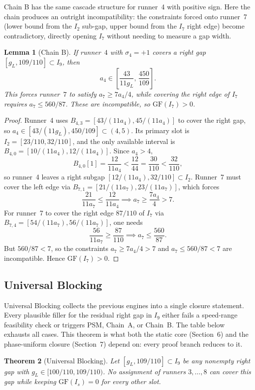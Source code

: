 \documentclass[12pt,a4paper]{amsart}
\newtheorem{theorem}{Theorem}[section]
\newtheorem{lemma}[theorem]{Lemma}
\theoremstyle{definition}
\theoremstyle{remark}
\newcommand{\GF}{\mathrm{GF}}
\begin{document}
Chain B has the same cascade structure for runner~4 with positive sign. Here the chain
produces an outright incompatibility: the constraints forced onto runner~7 (lower bound
from the $I_2$ sub-gap, upper bound from the $I_7$ right edge) become contradictory,
directly opening $I_7$ without needing to measure a gap width.

\begin{lemma}[Chain B]\label{lem:chainB}
If runner~$4$ with $\sigma_4=+1$ covers a right gap $[g_L,109/110]\subset I_9$, then
\[
  a_4 \in \left[\frac{43}{11g_L},\,\frac{450}{109}\right].
\]
This forces runner~$7$ to satisfy $a_7\ge 7a_4/4$, while covering the right edge of $I_7$
requires $a_7\le 560/87$. These are incompatible, so $\GF(I_7)>0$.
\end{lemma}

\begin{proof}
Runner~4 uses $B_{4,3}=[43/(11a_4),45/(11a_4)]$ to cover the right gap, so
$a_4\in[43/(11g_L),450/109]\subset(4,5)$. Its primary slot is $I_2=[23/110,32/110]$, and
the only available interval is $B_{4,0}=[10/(11a_4),12/(11a_4)]$. Since $a_4>4$,
\[
  B_{4,0}[1] = \frac{12}{11a_4} < \frac{12}{44} = \frac{30}{110} < \frac{32}{110},
\]
so runner~4 leaves a right subgap $[12/(11a_4),32/110]\subset I_2$. Runner~7 must cover
the left edge via $B_{7,1}=[21/(11a_7),23/(11a_7)]$, which forces
\[
  \frac{21}{11a_7} \le \frac{12}{11a_4} \implies a_7 \ge \frac{7a_4}{4} > 7.
\]
For runner~7 to cover the right edge $87/110$ of $I_7$
via $B_{7,4}=[54/(11a_7),56/(11a_7)]$, one needs
\[
  \frac{56}{11a_7} \ge \frac{87}{110} \implies a_7 \le \frac{560}{87}.
\]
But $560/87<7$, so the constraints $a_7\ge 7a_4/4>7$
and $a_7\le 560/87<7$ are incompatible. Hence $\GF(I_7)>0$.
\end{proof}

\subsection{Universal Blocking}

Universal Blocking collects the previous engines into a single closure statement. Every
plausible filler for the residual right gap in $I_9$ either fails a speed-range feasibility
check or triggers PSM, Chain~A, or Chain~B. The table below exhausts all cases. This
theorem is what both the static core (Section~6) and the phase-uniform closure (Section~7)
depend on: every proof branch reduces to it.

\begin{theorem}[Universal Blocking]\label{thm:ub}
Let $[g_L,109/110]\subset I_9$ be any nonempty right gap with $g_L\in[100/110,109/110)$.
No assignment of runners $3,\ldots,8$ can cover this gap while keeping $\GF(I_s)=0$ for
every other slot.
\end{theorem}
\end{document}
